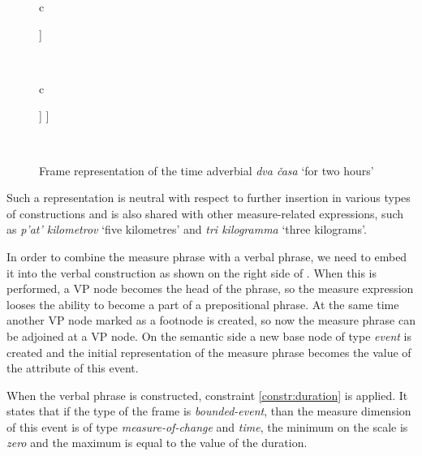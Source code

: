 \begin{figure}
\begin{tabular}[b]{c}
\begin{forest}
[NumP\textsuperscript{[I=\textbf{f}]}
[Num] [N]
]
\end{forest}\\
\end{tabular}\hspace{2cm}
\begin{tabular}[b]{c}
\begin{forest}
[VP\textsuperscript{[E=\textbf{e}]}
  [VP*]
  [NumP\textsuperscript{[I=\textbf{f}]}
    [Num] [N]
  ]
]
\end{forest}\\
\end{tabular}
\caption{Frame representation of the time adverbial \textit{dva \v{c}asa} `for two hours' \label{frame:2hours}}
\end{figure}

Such a representation is neutral with respect to further insertion in various types of constructions and is also shared with other measure-related expressions, such as \textit{p'at' kilometrov} `five kilometres' and \textit{tri kilogramma} `three kilograms'.

In order to combine the measure phrase with a verbal phrase, we need to embed it into the verbal construction as shown on the right side of . When this is performed, a VP node becomes the head of the phrase, so the measure expression looses the ability to become a part of a prepositional phrase. At the same time another VP node marked as a footnode is created, so now the measure phrase can be adjoined at a VP node.  On the semantic side a new base node of type \textit{event} is created and the initial representation of the measure phrase becomes the value of the \DURATION attribute of this event.

When the verbal phrase is constructed, constraint \ref{constr:duration} is applied. It states that if the type of the frame is \textit{bounded-event}, than the measure dimension of this event is of type \textit{measure-of-change} and \textit{time}, the minimum on the scale is \textit{zero} and the maximum is equal to the value of the duration.

